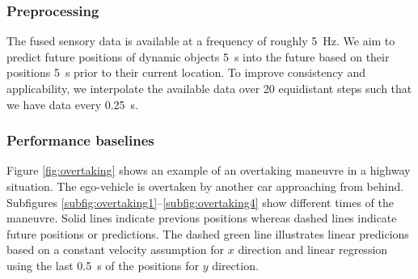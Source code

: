 \subsubsection{Preprocessing}
The fused sensory data is available at a frequency of roughly \SI{5}{\hertz}.
We aim to predict future positions of dynamic objects \SI{5}{\second} into the future based on their positions \SI{5}{\second} prior to their current location.
To improve consistency and applicability, we interpolate the available data over 20 equidistant steps such that we have data every \SI{0.25}{\second}.
\subsubsection{Performance baselines}
Figure \ref{fig:overtaking} shows an example of an overtaking maneuvre in a highway situation.
The ego-vehicle is overtaken by another car approaching from behind.
Subfigures \ref{subfig:overtaking1}--\ref{subfig:overtaking4} show different times of the maneuvre.
Solid lines indicate previous positions whereas dashed lines indicate future positions or predictions.
The dashed green line illustrates linear predicions based on a constant velocity assumption for $x$ direction and linear regression using the last \SI{0.5}{\second} of the positions for $y$ direction.
